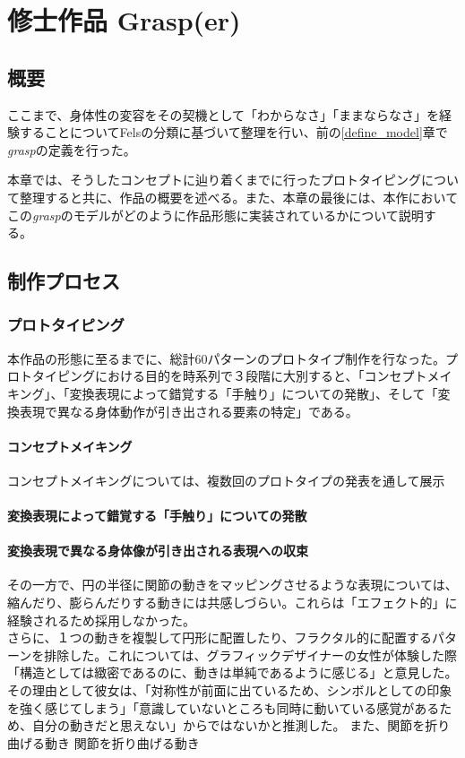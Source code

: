 \chapter{修士作品 Grasp(er)}
\section{概要}
ここまで、身体性の変容をその契機として「わからなさ」「ままならなさ」を経験することについてFelsの分類に基づいて整理を行い、前の\ref{define_model}章で\textit{grasp}の定義を行った。

本章では、そうしたコンセプトに辿り着くまでに行ったプロトタイピングについて整理すると共に、作品の概要を述べる。また、本章の最後には、本作においてこの\textit{grasp}のモデルがどのように作品形態に実装されているかについて説明する。

\section{制作プロセス}
\subsection{プロトタイピング}
本作品の形態に至るまでに、総計60パターンのプロトタイプ制作を行なった。プロトタイピングにおける目的を時系列で３段階に大別すると、「コンセプトメイキング」、「変換表現によって錯覚する「手触り」についての発散」、そして「変換表現で異なる身体動作が引き出される要素の特定」である。
\subsubsection{コンセプトメイキング}
コンセプトメイキングについては、複数回のプロトタイプの発表を通して展示
\subsubsection{変換表現によって錯覚する「手触り」についての発散}
\subsubsection{変換表現で異なる身体像が引き出される表現への収束}
その一方で、円の半径に関節の動きをマッピングさせるような表現については、縮んだり、膨らんだりする動きには共感しづらい。これらは「エフェクト的」に経験されるため採用しなかった。\\
さらに、１つの動きを複製して円形に配置したり、フラクタル的に配置するパターンを排除した。これについては、グラフィックデザイナーの女性が体験した際「構造としては緻密であるのに、動きは単純であるように感じる」と意見した。その理由として彼女は、「対称性が前面に出ているため、シンボルとしての印象を強く感じてしまう」「意識していないところも同時に動いている感覚があるため、自分の動きだと思えない」からではないかと推測した。
また、関節を折り曲げる動き
関節を折り曲げる動き

